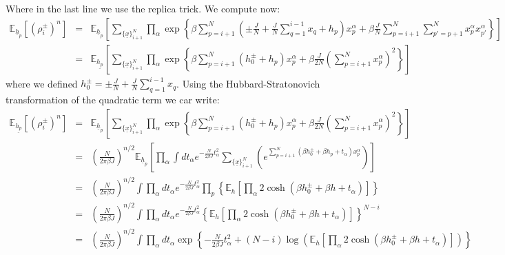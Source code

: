 \documentclass{article}
\begin{document}
Where in the last line we use the replica trick. We compute now:
\begin{eqnarray}
\mathbb{E}_{\underline{h}_p}\left[(\rho_i^{\pm})^n \right] & = & 
\mathbb{E}_{\underline{h}_p}\left[ 
\sum_{\{\underline{x}\}_{i+1}^N} \prod_{\alpha}
\exp\left\{
\beta\sum_{p=i+1}^{N}\left( \pm \frac{J}{N} + \frac{J}{N} \sum_{q=1}^{i-1} x_q + h_p \right) x_p^{\alpha} + \beta \frac{J}{N} \sum_{p=i+1}^{N}\sum_{p'=p+1}^{N} x_p^{\alpha} x_{p'}^{\alpha} 
\right\}
\right]\\
& = & 
\mathbb{E}_{\underline{h_p}}\left[ 
\sum_{\{\underline{x}\}_{i+1}^N} \prod_{\alpha}
\exp\left\{
\beta\sum_{p=i+1}^{N}\left( h_0^{\pm}+ h_p \right) x_p^{\alpha} + \beta \frac{J}{2N} (\sum_{p=i+1}^{N} x_p^{\alpha} )^2
\right\}
\right] 
\end{eqnarray}
where we defined $h_0^{\pm} = \pm \frac{J}{N} + \frac{J}{N} \sum_{q=1}^{i-1} x_q $. Using the Hubbard-Stratonovich transformation of the quadratic term we car write:
\begin{eqnarray}
\mathbb{E}_{\underline{h_p}}\left[(\rho_i^{\pm})^n \right] & = & \mathbb{E}_{\underline{h}_p}\left[ 
\sum_{\{\underline{x}\}_{i+1}^N} \prod_{\alpha}
\exp\left\{
\beta\sum_{p=i+1}^{N}\left( h_0^{\pm}+ h_p \right) x_p^{\alpha} + \beta \frac{J}{2N} (\sum_{p=i+1}^{N} x_p^{\alpha} )^2
\right\}
\right] \\
&=& 
\left(\frac{N}{2\pi \beta J}\right)^{n/2}
\mathbb{E}_{\underline{h}_p}\left[ \prod_{\alpha}
\int dt_{\alpha} e^{ -\frac{N}{2\beta J} t_{\alpha}^2}
\sum_{\{\underline{x}\}_{i+1}^N}
\left( 
e^{
\sum_{p=i+1}^{N}\left(\beta h_0^{\pm}+\beta h_p +t_{\alpha}\right) x_p^{\alpha}
}
\right)
\right] \\
& = & 
\left(\frac{N}{2\pi \beta J}\right)^{n/2}
\int \prod_{\alpha} dt_{\alpha} e^{ -\frac{N}{2\beta J} t_{\alpha}^2}
\prod_{p} \left\{
\mathbb{E}_h\left[
\prod_{\alpha} 2 \cosh \left( 
\beta h_{0}^{\pm} + \beta h + t_{\alpha}
\right)
\right]
\right\} \\
& = &
\left(\frac{N}{2\pi \beta J}\right)^{n/2}
\int \prod_{\alpha} dt_{\alpha} e^{ -\frac{N}{2\beta J} t_{\alpha}^2}
\left\{
\mathbb{E}_h\left[
\prod_{\alpha} 2 \cosh \left( 
\beta h_{0}^{\pm} + \beta h + t_{\alpha}
\right)
\right]
\right\}^{N-i} \\
& = &
\left(\frac{N}{2\pi \beta J}\right)^{n/2}
\int \prod_{\alpha} dt_{\alpha} \exp \left\{ -\frac{N}{2\beta J} t_{\alpha}^2 +
(N-i) \log \left(
\mathbb{E}_h\left[
\prod_{\alpha} 2 \cosh \left( 
\beta h_{0}^{\pm} + \beta h + t_{\alpha}
\right)
\right]
\right)
\right\}
\\
\end{eqnarray}
\end{document}

